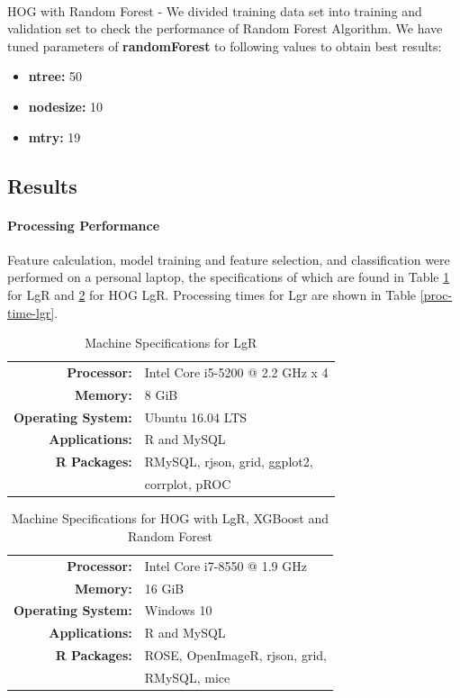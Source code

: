 \documentclass[fleqn,10pt]{SelfArx} %
\begin{document}
\paragraph{}HOG with Random Forest - 
We divided training data set into training and validation set to check the performance of Random Forest Algorithm.
We have tuned parameters of \textbf{randomForest} to following values to obtain best results:
\begin{itemize}
	\item \textbf{ntree:} 50
	\item \textbf{nodesize:} 10
	\item \textbf{mtry:} 19
\end{itemize}    


\subsection{Results}

\paragraph{Processing Performance}
Feature calculation, model training and feature selection, and classification were performed on a personal laptop, the specifications of which are found in Table \ref{machine-specs-lgr} for LgR and \ref{machine-specs} for HOG LgR.  Processing times for Lgr are shown in Table \ref{proc-time-lgr}.

\begin{table}[H]
	\centering
	\caption{Machine Specifications for LgR}\label{machine-specs-lgr}
	\begin{tabular}{r l}
		\toprule
		\textbf{Processor:} 		& Intel Core i5-5200 @ 2.2 GHz x 4 \\
		\textbf{Memory:}			& 8 GiB \\
		\textbf{Operating System:}	& Ubuntu 16.04 LTS \\
		\textbf{Applications:}		& R and MySQL \\
		\textbf{R Packages:}		& RMySQL, rjson, grid, ggplot2, \\
									& corrplot, pROC
	\end{tabular}
\end{table}

\begin{table}[H]
	\centering
	\caption{Machine Specifications for HOG with LgR, XGBoost and Random Forest}\label{machine-specs}
	\begin{tabular}{r l}
		\toprule
		\textbf{Processor:} 		& Intel Core i7-8550 @ 1.9 GHz \\
		\textbf{Memory:}			& 16 GiB \\
		\textbf{Operating System:}	& Windows 10 \\
		\textbf{Applications:}		& R and MySQL \\
		\textbf{R Packages:}		& ROSE, OpenImageR, rjson, grid,\\
		& RMySQL, mice
	\end{tabular}
\end{table}
\end{document}
